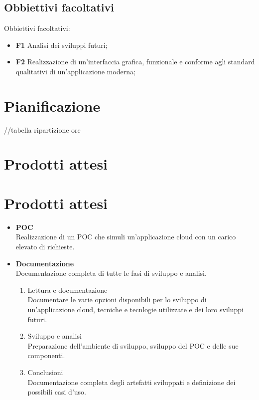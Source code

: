 \subsection{Obbiettivi facoltativi}
Obbiettivi facoltativi:
\begin{itemize}
    \item \textbf{F1} Analisi dei sviluppi futuri;
    \item \textbf{F2} Realizzazione di un'interfaccia grafica, funzionale e conforme agli standard qualitativi di un'applicazione moderna;

\end{itemize}
\section{Pianificazione}
\label{sec:pianificazione}
//tabella ripartizione ore\\

\section{Prodotti attesi}
\section*{Prodotti attesi}
\label{sec:prodotti-attesi}

\begin{itemize}
    \item \textbf{POC} \\
    Realizzazione di un POC che simuli un'applicazione cloud con un carico elevato di richieste.
    \item \textbf{Documentazione} \\
    Documentazione completa di tutte le fasi di sviluppo e analisi.
    \begin{enumerate}
        \item Lettura e documentazione \\
         Documentare le varie opzioni disponibili per lo sviluppo di un'applicazione cloud, tecniche e tecnlogie utilizzate e dei loro sviluppi futuri.
        
        \item Sviluppo e analisi \\
        Preparazione dell'ambiente di sviluppo, sviluppo del POC e delle sue componenti.
    
        
        \item Conclusioni \\
        Documentazione completa degli artefatti sviluppati e definizione dei possibili casi d'uso.
    \end{enumerate}
\end{itemize}




